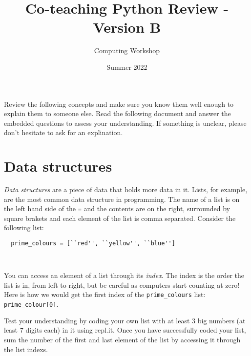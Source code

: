 \documentclass[11pt]{article}
\author{Computing Workshop}
\title{Co-teaching Python Review - Version B}
\date{Summer 2022}
\begin{document}
\maketitle

Review the following concepts and make sure you know them well enough to explain them to someone else. Read the
following document and answer the embedded questions to assess your understanding. If something is unclear, please don't hesitate to ask for an explination.

\section*{Data structures}

\emph{Data structures} are a piece of data that holds more data in it.
Lists, for example, are the most common data structure in programming. The name of a list is on the left hand side of the \texttt{=}
and the contents are on the right, surrounded by square brakets and each element of the list is comma separated. Consider the following list:

\begin{lstlisting}
  prime_colours = [``red'', ``yellow'', ``blue'']
\end{lstlisting}
~

You can access an element of a list through its \emph{index}. The index is the order the list is in, from left to right,
but be careful as computers start counting at zero! Here is how we would get the first index of the \texttt{prime\_colours}
list: \texttt{prime\_colour[0]}.

Test your understanding by coding your own list with at least 3 big numbers (at least 7 digits each) in it using repl.it. Once you have successfully
coded your list, sum the number of the first and last element of the list by accessing it through the list indexs.
\end{document}
